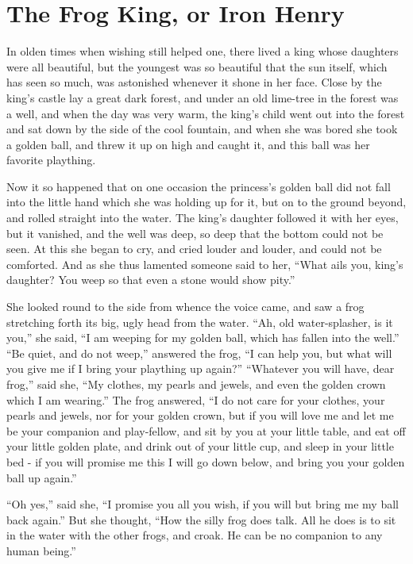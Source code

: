 \documentclass{article}
\begin{document}
\section{The Frog King, or Iron Henry}

In olden times when wishing still helped one, there lived a king whose daughters were all beautiful, but the youngest was so beautiful that the sun itself, which has seen so much, was astonished whenever it shone in her face.  Close by the king's castle lay a great dark forest, and under an old lime-tree in the forest was a well, and when the day was very warm, the king's child went out into the forest and sat down by the side of the cool fountain, and when she was bored she took a golden ball, and threw it up on high and caught it, and this ball was her favorite plaything.

Now it so happened that on one occasion the princess's golden ball did not fall into the little hand which she was holding up for it, but on to the ground beyond, and rolled straight into the water.  The king's daughter followed it with her eyes, but it vanished, and the well was deep, so deep that the bottom could not be seen.  At this she began to cry, and cried louder and louder, and could not be comforted.  And as she thus lamented someone said to her, “What ails you, king's daughter?  You weep so that even a stone would show pity.”

She looked round to the side from whence the voice came, and saw a frog stretching forth its big, ugly head from the water.  “Ah, old water-splasher, is it you,” she said, “I am weeping for my golden ball, which has fallen into the well.”  “Be quiet, and do not weep,” answered the frog, “I can help you, but what will you give me if I bring your plaything up again?”  “Whatever you will have, dear frog,” said she, “My clothes, my pearls and jewels, and even the golden crown which I am wearing.”  The frog answered, “I do not care for your clothes, your pearls and jewels, nor for your golden crown, but if you will love me and let me be your companion and play-fellow, and sit by you at your little table, and eat off your little golden plate, and drink out of your little cup, and sleep in your little bed - if you will promise me this I will go down below, and bring you your golden ball up again.”

“Oh yes,” said she, “I promise you all you wish, if you will but bring me my ball back again.”  But she thought, “How the silly frog does talk.  All he does is to sit in the water with the other frogs, and croak.  He can be no companion to any human being.”
\end{document}
